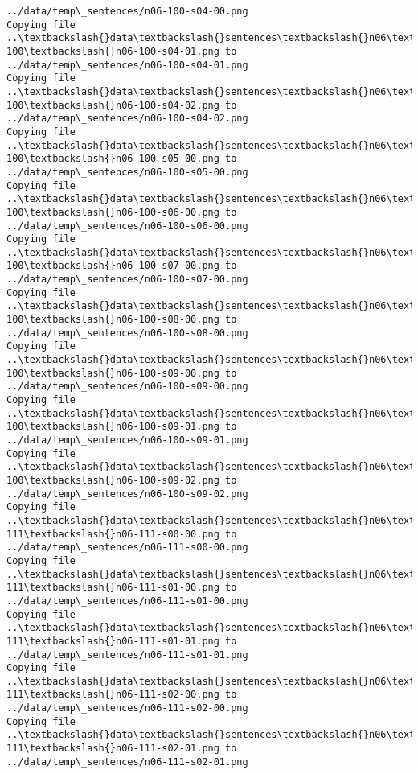 \documentclass[11pt]{article}
\begin{document}
\begin{Verbatim}[commandchars=\\\{\}]
../data/temp\_sentences/n06-100-s04-00.png
Copying file ..\textbackslash{}data\textbackslash{}sentences\textbackslash{}n06\textbackslash{}n06-100\textbackslash{}n06-100-s04-01.png to
../data/temp\_sentences/n06-100-s04-01.png
Copying file ..\textbackslash{}data\textbackslash{}sentences\textbackslash{}n06\textbackslash{}n06-100\textbackslash{}n06-100-s04-02.png to
../data/temp\_sentences/n06-100-s04-02.png
Copying file ..\textbackslash{}data\textbackslash{}sentences\textbackslash{}n06\textbackslash{}n06-100\textbackslash{}n06-100-s05-00.png to
../data/temp\_sentences/n06-100-s05-00.png
Copying file ..\textbackslash{}data\textbackslash{}sentences\textbackslash{}n06\textbackslash{}n06-100\textbackslash{}n06-100-s06-00.png to
../data/temp\_sentences/n06-100-s06-00.png
Copying file ..\textbackslash{}data\textbackslash{}sentences\textbackslash{}n06\textbackslash{}n06-100\textbackslash{}n06-100-s07-00.png to
../data/temp\_sentences/n06-100-s07-00.png
Copying file ..\textbackslash{}data\textbackslash{}sentences\textbackslash{}n06\textbackslash{}n06-100\textbackslash{}n06-100-s08-00.png to
../data/temp\_sentences/n06-100-s08-00.png
Copying file ..\textbackslash{}data\textbackslash{}sentences\textbackslash{}n06\textbackslash{}n06-100\textbackslash{}n06-100-s09-00.png to
../data/temp\_sentences/n06-100-s09-00.png
Copying file ..\textbackslash{}data\textbackslash{}sentences\textbackslash{}n06\textbackslash{}n06-100\textbackslash{}n06-100-s09-01.png to
../data/temp\_sentences/n06-100-s09-01.png
Copying file ..\textbackslash{}data\textbackslash{}sentences\textbackslash{}n06\textbackslash{}n06-100\textbackslash{}n06-100-s09-02.png to
../data/temp\_sentences/n06-100-s09-02.png
Copying file ..\textbackslash{}data\textbackslash{}sentences\textbackslash{}n06\textbackslash{}n06-111\textbackslash{}n06-111-s00-00.png to
../data/temp\_sentences/n06-111-s00-00.png
Copying file ..\textbackslash{}data\textbackslash{}sentences\textbackslash{}n06\textbackslash{}n06-111\textbackslash{}n06-111-s01-00.png to
../data/temp\_sentences/n06-111-s01-00.png
Copying file ..\textbackslash{}data\textbackslash{}sentences\textbackslash{}n06\textbackslash{}n06-111\textbackslash{}n06-111-s01-01.png to
../data/temp\_sentences/n06-111-s01-01.png
Copying file ..\textbackslash{}data\textbackslash{}sentences\textbackslash{}n06\textbackslash{}n06-111\textbackslash{}n06-111-s02-00.png to
../data/temp\_sentences/n06-111-s02-00.png
Copying file ..\textbackslash{}data\textbackslash{}sentences\textbackslash{}n06\textbackslash{}n06-111\textbackslash{}n06-111-s02-01.png to
../data/temp\_sentences/n06-111-s02-01.png

\end{Verbatim}
\end{document}
